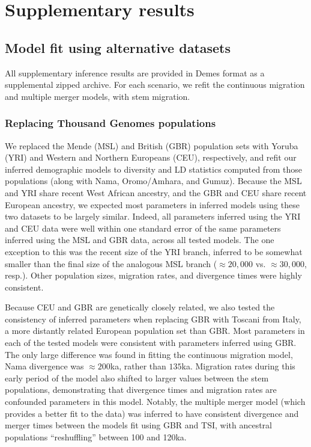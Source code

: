 \documentclass[]{article}
\begin{document}
\section{Supplementary results}\label{sec:supp-results}

\subsection{Model fit using alternative datasets}
\label{sec:supp-alt-data}

All supplementary inference results are provided in Demes format
\citep{Gower2022-yn} as a supplemental zipped archive. For each scenario,
we refit the continuous migration and multiple merger models, with
stem migration.

\subsubsection{Replacing Thousand Genomes populations}

We replaced the Mende (MSL) and British (GBR) population sets with Yoruba (YRI)
and Western and Northern Europeans (CEU), respectively, and refit our inferred
demographic models to diversity and LD statistics computed from those
populations (along with Nama, Oromo/Amhara, and Gumuz). Because the MSL and YRI
share recent West African ancestry, and the GBR and CEU share recent European
ancestry, we expected most parameters in inferred models using these two
datasets to be largely similar. Indeed, all parameters inferred using the YRI
and CEU data were well within one standard error of the same parameters
inferred using the MSL and GBR data, across all tested models. The one
exception to this was the recent size of the YRI branch, inferred to be
somewhat smaller than the final size of the analogous MSL branch ($\approx
20,000$ vs. $\approx 30,000$, resp.). Other population sizes, migration rates,
and divergence times were highly consistent.

Because CEU and GBR are genetically closely related, we also tested the
consistency of inferred parameters when replacing GBR with Toscani from Italy,
a more distantly related European population set than GBR. Most parameters in
each of the tested models were consistent with parameters inferred using GBR.
The only large difference was found in fitting the continuous migration model,
Nama divergence was $\approx200$ka, rather than $135$ka. Migration rates during
this early period of the model also shifted to larger values between the stem
populations, demonstrating that divergence times and migration rates are
confounded parameters in this model. Notably, the multiple merger model (which
provides a better fit to the data) was inferred to have consistent divergence
and merger times between the models fit using GBR and TSI, with ancestral
populations ``reshuffling'' between 100 and 120ka.
\end{document}
